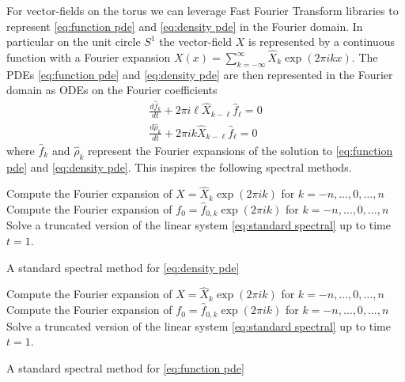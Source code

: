 \documentclass[12pt]{amsart}
\begin{document}
For vector-fields on the torus we can leverage Fast Fourier Transform libraries to represent \eqref{eq:function pde} and \eqref{eq:density pde} in the Fourier domain.
In particular on the unit circle $S^{1}$ the vector-field $X$ is represented by a continuous function with a Fourier expansion $X(x) = \sum_{k=-\infty}^{\infty} \hat{X}_{k} \exp( 2\pi i kx)$.
The PDEs \eqref{eq:function pde} and \eqref{eq:density pde} are then represented in the Fourier domain as
ODEs on the Fourier coefficients
\begin{align}
	\frac{d \hat{f}_{k}}{dt} + 2\pi i \ell \hat{X}_{k-\ell} \hat{f}_{\ell} = 0 \\
	\frac{d \hat{\rho}_{k}}{dt} + 2\pi i k \hat{X}_{k-\ell} \hat{f}_{\ell} = 0
\end{align}
where $\hat{f}_{k}$ and $\hat{\rho}_{k}$ represent the Fourier expansions of the solution to \eqref{eq:function pde} and \eqref{eq:density pde}.
This inspires the following spectral methods.

\begin{algorithm}[h]
	Compute the Fourier expansion of $X = \hat{X}_{k} \exp( 2\pi i k)$ for $k=-n,\dots,0,\dots,n$\;
	Compute the Fourier expansion of $f_{0} = \hat{f}_{0,k} \exp( 2\pi i k)$ for $k=-n,\dots,0,\dots,n$\;
	Solve a truncated version of the linear system \eqref{eq:standard spectral} up to time $t=1$.\;
	\caption{A standard spectral method for \eqref{eq:density pde}}\label{alg:spectral density}
\end{algorithm}

\begin{algorithm}[h]
	Compute the Fourier expansion of $X = \hat{X}_{k} \exp( 2\pi i k)$ for $k=-n,\dots,0,\dots,n$\;
	Compute the Fourier expansion of $f_{0} = \hat{f}_{0,k} \exp( 2\pi i k)$ for $k=-n,\dots,0,\dots,n$\;
	Solve a truncated version of the linear system \eqref{eq:standard spectral} up to time $t=1$.\;
	\caption{A standard spectral method for \eqref{eq:function pde}}\label{alg:spectral function}
\end{algorithm}
\end{document}

